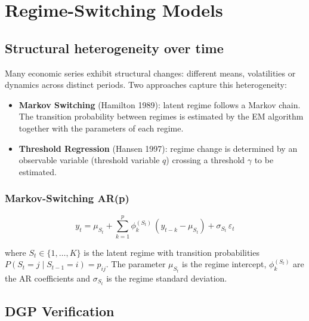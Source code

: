 \chapter{Regime-Switching Models}
\label{cap:regime}

\section{Structural heterogeneity over time}

Many economic series exhibit structural changes: different means,
volatilities or dynamics across distinct periods. Two approaches capture
this heterogeneity:

\begin{itemize}
  \item \textbf{Markov Switching} (Hamilton 1989): latent regime follows a
  Markov chain. The transition probability between regimes is estimated
  by the EM algorithm together with the parameters of each regime.
  \item \textbf{Threshold Regression} (Hansen 1997): regime change is
  determined by an observable variable (threshold variable $q$) crossing a
  threshold $\gamma$ to be estimated.
\end{itemize}

\subsection*{Markov-Switching AR(p)}

\[
  y_t = \mu_{S_t} + \sum_{k=1}^p \phi_k^{(S_t)}\,(y_{t-k} - \mu_{S_t}) + \sigma_{S_t}\,\varepsilon_t
\]

where $S_t \in \{1,\ldots,K\}$ is the latent regime with transition
probabilities $P(S_t = j \mid S_{t-1} = i) = p_{ij}$. The parameter $\mu_{S_t}$
is the regime intercept, $\phi_k^{(S_t)}$ are the AR coefficients and
$\sigma_{S_t}$ is the regime standard deviation.

\section{DGP Verification}

